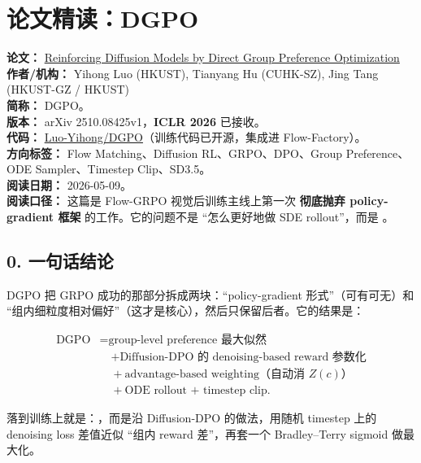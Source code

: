
\section{论文精读：DGPO}

\begin{conceptbox}
\textbf{论文：} \href{https://arxiv.org/abs/2510.08425}{Reinforcing Diffusion Models by Direct Group Preference Optimization}\\
\textbf{作者/机构：} Yihong Luo (HKUST), Tianyang Hu (CUHK-SZ), Jing Tang (HKUST-GZ / HKUST)\\
\textbf{简称：} DGPO。\\
\textbf{版本：} arXiv 2510.08425v1，\textbf{ICLR 2026} 已接收。\\
\textbf{代码：} \href{https://github.com/Luo-Yihong/DGPO}{Luo-Yihong/DGPO}（训练代码已开源，集成进 Flow-Factory）。\\
\textbf{方向标签：} Flow Matching、Diffusion RL、GRPO、DPO、Group Preference、ODE Sampler、Timestep Clip、SD3.5。\\
\textbf{阅读日期：} 2026-05-09。\\
\textbf{阅读口径：} 这篇是 Flow-GRPO 视觉后训练主线上第一次 \textbf{彻底抛弃 policy-gradient 框架} 的工作。它的问题不是 ``怎么更好地做 SDE rollout''，而是 。
\end{conceptbox}

\subsection{0. 一句话结论}

DGPO 把 GRPO 成功的那部分拆成两块：``policy-gradient 形式''（可有可无）和 ``组内细粒度相对偏好''（这才是核心），然后只保留后者。它的结果是：

\[
\begin{aligned}
\text{DGPO}
&= \text{group-level preference 最大似然}\\
&\quad + \text{Diffusion-DPO 的 denoising-based reward 参数化}\\
&\quad + \text{advantage-based weighting（自动消 } Z(c)\text{）}\\
&\quad + \text{ODE rollout + timestep clip}.
\end{aligned}
\]

落到训练上就是：，而是沿 Diffusion-DPO 的做法，用随机 timestep 上的 denoising loss 差值近似 ``组内 reward 差''，再套一个 Bradley--Terry sigmoid 做最大化。

